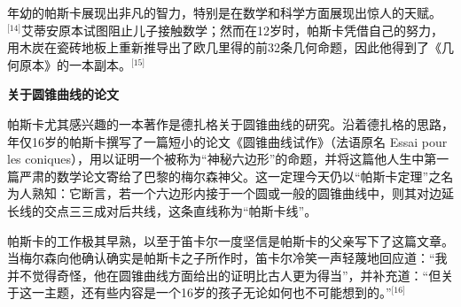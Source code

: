 年幼的帕斯卡展现出非凡的智力，特别是在数学和科学方面展现出惊人的天赋。\(^\text{[14]}\)艾蒂安原本试图阻止儿子接触数学；然而在12岁时，帕斯卡凭借自己的努力，用木炭在瓷砖地板上重新推导出了欧几里得的前32条几何命题，因此他得到了《几何原本》的一本副本。\(^\text{[15]}\)

\textbf{关于圆锥曲线的论文}

帕斯卡尤其感兴趣的一本著作是德扎格关于圆锥曲线的研究。沿着德扎格的思路，年仅16岁的帕斯卡撰写了一篇短小的论文《圆锥曲线试作》（法语原名 Essai pour les coniques），用以证明一个被称为“神秘六边形”的命题，并将这篇他人生中第一篇严肃的数学论文寄给了巴黎的梅尔森神父。这一定理今天仍以“帕斯卡定理”之名为人熟知：它断言，若一个六边形内接于一个圆或一般的圆锥曲线中，则其对边延长线的交点三三成对后共线，这条直线称为“帕斯卡线”。

帕斯卡的工作极其早熟，以至于笛卡尔一度坚信是帕斯卡的父亲写下了这篇文章。当梅尔森向他确认确实是帕斯卡之子所作时，笛卡尔冷笑一声轻蔑地回应道：“我并不觉得奇怪，他在圆锥曲线方面给出的证明比古人更为得当”，并补充道：“但关于这一主题，还有些内容是一个16岁的孩子无论如何也不可能想到的。”\(^\text{[16]}\)
